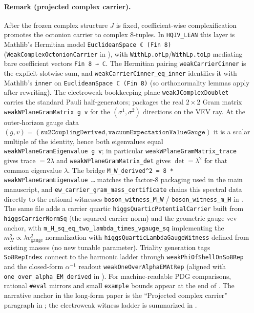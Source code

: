 \documentclass[11pt]{article}
\begin{document}
\paragraph{Remark (projected complex carrier).}
After the frozen complex structure $J$ is fixed, coefficient-wise complexification promotes the octonion carrier to complex $8$-tuples.
In \texttt{HQIV\_LEAN} this layer is Mathlib's Hermitian model \texttt{EuclideanSpace\,ℂ\,(Fin\,8)} (\texttt{WeakComplexOctonionCarrier} in ), with \texttt{WithLp.ofLp}/\texttt{WithLp.toLp} mediating bare coefficient vectors \texttt{Fin\,8\,→\,ℂ}.
The Hermitian pairing \texttt{weakCarrierCinner} is the explicit slotwise sum, and \texttt{weakCarrierCinner\_eq\_inner} identifies it with Mathlib's \texttt{inner} on \texttt{EuclideanSpace\,ℂ\,(Fin\,8)} (so orthonormality lemmas apply after rewriting).
The electroweak bookkeeping plane \texttt{weakJComplexDoublet} carries the standard Pauli half-generators;  packages the real $2\times2$ Gram matrix \texttt{weakWPlaneGramMatrix\,g\,v} for the $(\sigma^1,\sigma^2)$ directions on the VEV ray.
At the outer-horizon gauge data $(g,v)=(\texttt{su2CouplingDerived},\texttt{vacuumExpectationValueGauge})$ it is a scalar multiple of the identity, hence both eigenvalues equal \texttt{weakWPlaneGramEigenvalue\,g\,v}; in particular \texttt{weakWPlaneGramMatrix\_trace} gives trace $=2\lambda$ and \texttt{weakWPlaneGramMatrix\_det} gives $\det=\lambda^2$ for that common eigenvalue $\lambda$.
The bridge \texttt{M\_W\_derived\^{}2\,=\,8\,*\,weakWPlaneGramEigenvalue\,…} matches the factor-$8$ packaging used in the main manuscript, and \texttt{ew\_carrier\_gram\_mass\_certificate} chains this spectral data directly to the rational witnesses \texttt{boson\_witness\_M\_W} / \texttt{boson\_witness\_m\_H} in .
The same file adds a carrier quartic \texttt{higgsQuarticPotentialCarrier} built from \texttt{higgsCarrierNormSq} (the squared carrier norm) and the geometric gauge vev anchor, with \texttt{m\_H\_sq\_eq\_two\_lambda\_times\_vgauge\_sq} implementing the $m_H^2\propto \lambda v_{\mathrm{gauge}}^2$ normalization with \texttt{higgsQuarticLambdaGaugeWitness} defined from existing masses (no new tunable parameter).
Triality generation tags \texttt{So8RepIndex} connect to the harmonic ladder through \texttt{weakPhiOfShellOnSo8Rep} and the closed-form $\alpha^{-1}$ readout \texttt{weakOneOverAlphaEMAtRep} (aligned with \texttt{one\_over\_alpha\_EM\_derived} in ).
For machine-readable PDG comparisons, rational \texttt{\#eval} mirrors and small \texttt{example} bounds appear at the end of .
The narrative anchor in the long-form paper is the ``Projected complex carrier'' paragraph in ; the electroweak witness ladder is summarized in .
\end{document}
